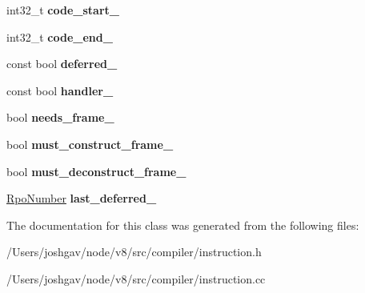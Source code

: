 \begin{DoxyCompactItemize}
\item 
int32\+\_\+t {\bfseries code\+\_\+start\+\_\+}\hypertarget{classv8_1_1internal_1_1compiler_1_1_instruction_block_ad3a7f072c808f6f24d45810c548f1a74}{}\label{classv8_1_1internal_1_1compiler_1_1_instruction_block_ad3a7f072c808f6f24d45810c548f1a74}

\item 
int32\+\_\+t {\bfseries code\+\_\+end\+\_\+}\hypertarget{classv8_1_1internal_1_1compiler_1_1_instruction_block_ab7e02c5e7e6e424c8baa0c250f68e6b9}{}\label{classv8_1_1internal_1_1compiler_1_1_instruction_block_ab7e02c5e7e6e424c8baa0c250f68e6b9}

\item 
const bool {\bfseries deferred\+\_\+}\hypertarget{classv8_1_1internal_1_1compiler_1_1_instruction_block_a5625f2fac75c9257d20ae77ebf877e02}{}\label{classv8_1_1internal_1_1compiler_1_1_instruction_block_a5625f2fac75c9257d20ae77ebf877e02}

\item 
const bool {\bfseries handler\+\_\+}\hypertarget{classv8_1_1internal_1_1compiler_1_1_instruction_block_a626a228bc4793fd7e38dda0c324eff84}{}\label{classv8_1_1internal_1_1compiler_1_1_instruction_block_a626a228bc4793fd7e38dda0c324eff84}

\item 
bool {\bfseries needs\+\_\+frame\+\_\+}\hypertarget{classv8_1_1internal_1_1compiler_1_1_instruction_block_a6bc3edca11a084aef504bb3c418c5bfb}{}\label{classv8_1_1internal_1_1compiler_1_1_instruction_block_a6bc3edca11a084aef504bb3c418c5bfb}

\item 
bool {\bfseries must\+\_\+construct\+\_\+frame\+\_\+}\hypertarget{classv8_1_1internal_1_1compiler_1_1_instruction_block_ab64203236f7cfeae2b2afbc901bf546f}{}\label{classv8_1_1internal_1_1compiler_1_1_instruction_block_ab64203236f7cfeae2b2afbc901bf546f}

\item 
bool {\bfseries must\+\_\+deconstruct\+\_\+frame\+\_\+}\hypertarget{classv8_1_1internal_1_1compiler_1_1_instruction_block_a60c492a2408e4cb6acbfb083601f4850}{}\label{classv8_1_1internal_1_1compiler_1_1_instruction_block_a60c492a2408e4cb6acbfb083601f4850}

\item 
\hyperlink{classv8_1_1internal_1_1compiler_1_1_rpo_number}{Rpo\+Number} {\bfseries last\+\_\+deferred\+\_\+}\hypertarget{classv8_1_1internal_1_1compiler_1_1_instruction_block_a6d8e2db3322d35b36b3cfb88c5d0051f}{}\label{classv8_1_1internal_1_1compiler_1_1_instruction_block_a6d8e2db3322d35b36b3cfb88c5d0051f}

\end{DoxyCompactItemize}


The documentation for this class was generated from the following files\+:\begin{DoxyCompactItemize}
\item 
/\+Users/joshgav/node/v8/src/compiler/instruction.\+h\item 
/\+Users/joshgav/node/v8/src/compiler/instruction.\+cc\end{DoxyCompactItemize}
